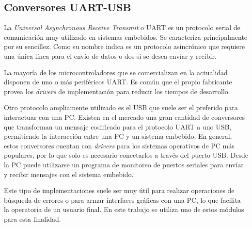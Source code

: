 \subsection{Conversores UART-USB}
\label{conversor_usb}
La \textit{Universal Asynchronous Receive Transmit} o UART es un protocolo serial de comunicación muy utilizado en sistemas embebidos. Se caracteriza principalmente por su sencillez. Como su nombre indica es un protocolo asincrónico que requiere una única línea para el envío de datos o dos si se desea envíar y recibir.

La mayoría de los microcontroladores que se comercializan en la actualidad disponen de uno o más periféricos UART. Es común que el propio fabricante provea los \textit{drivers} de implementación para reducir los tiempos de desarrollo.

Otro protocolo ampliamente utilizado es el USB que suele ser el preferido para interactuar con una PC. Existen en el mercado una gran cantidad de conversores que transforman un mensaje codificado para el protocolo UART a uno USB, permitiendo la interacción entre una PC y un sistema embebido. En general, estos conversores cuentan con \textit{drivers} para los sistemas operativos de PC más populares, por lo que solo es necesario conectarlos a través del puerto USB. Desde la PC puede utilizarse un programa de monitoreo de puertos seriales para envíar y recibir mensajes con el sistema embebido.

Este tipo de implementaciones suele ser muy útil para realizar operaciones de búsqueda de errores o para armar interfaces gráficas con una PC, lo que facilita la operatoria de un usuario final. En este trabajo se utiliza uno de estos módulos para esta finalidad.
